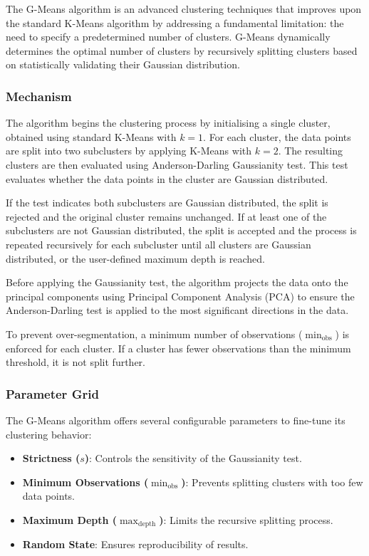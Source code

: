 The G-Means algorithm is an advanced clustering techniques that improves upon the standard K-Means algorithm by addressing
a fundamental limitation: the need to specify a predetermined number of clusters.
G-Means dynamically determines the optimal number of clusters by recursively splitting clusters based on 
statistically validating their Gaussian distribution.

\subsubsection*{Mechanism}

The algorithm begins the clustering process by initialising a single cluster, obtained using standard K-Means with \(k=1\).
For each cluster, the data points are split into two subclusters by applying K-Means with \(k=2\).
The resulting clusters are then evaluated using Anderson-Darling Gaussianity test. This test evaluates whether the data points in the cluster
are Gaussian distributed. 

If the test indicates both subclusters are Gaussian distributed, the split is rejected and the original cluster remains unchanged.
If at least one of the subclusters are not Gaussian distributed, the split is accepted and the process is repeated recursively for each subcluster
until all clusters are Gaussian distributed, or the user-defined maximum depth is reached.

Before applying the Gaussianity test, the algorithm projects the data onto the principal components using Principal Component
Analysis (PCA) to ensure the Anderson-Darling test is applied to the most significant directions in the data.

To prevent over-segmentation, a minimum number of observations (\(\min_{\text{obs}}\)) is enforced for each cluster.
If a cluster has fewer observations than the minimum threshold, it is not split further.

\subsubsection*{Parameter Grid}

The G-Means algorithm offers several configurable parameters to fine-tune its clustering behavior:

\begin{itemize}
    \item \textbf{Strictness ($s$)}: Controls the sensitivity of the Gaussianity test.
    \item \textbf{Minimum Observations ($\min_{\text{obs}}$)}: Prevents splitting clusters with too few data points.
    \item \textbf{Maximum Depth ($\max_{\text{depth}}$)}: Limits the recursive splitting process.
    \item \textbf{Random State}: Ensures reproducibility of results.
\end{itemize}

